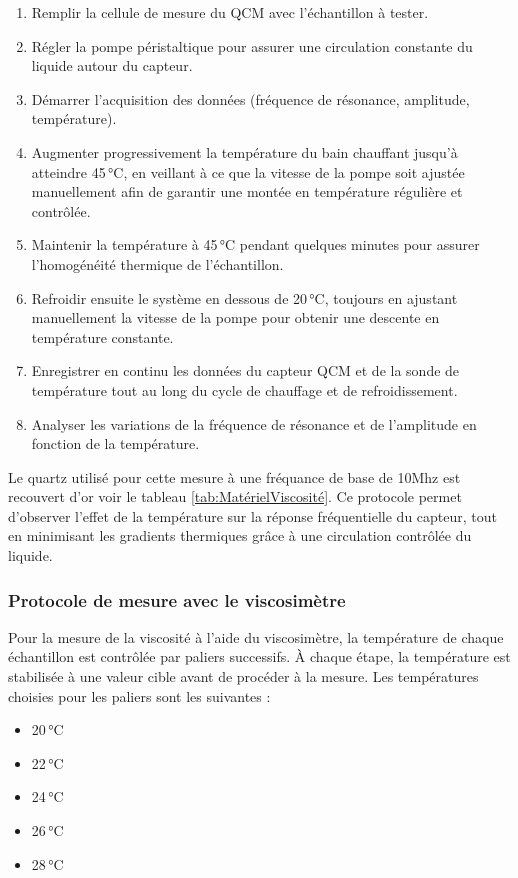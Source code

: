 \begin{enumerate}
    \item Remplir la cellule de mesure du QCM avec l'échantillon à tester.
    \item Régler la pompe péristaltique pour assurer une circulation constante du liquide autour du capteur.
    \item Démarrer l'acquisition des données (fréquence de résonance, amplitude, température).
    \item Augmenter progressivement la température du bain chauffant jusqu'à atteindre 45 °C, en veillant à ce que la vitesse de la pompe soit ajustée manuellement afin de garantir une montée en température régulière et contrôlée.
    \item Maintenir la température à 45 °C pendant quelques minutes pour assurer l'homogénéité thermique de l'échantillon.
    \item Refroidir ensuite le système en dessous de 20 °C, toujours en ajustant manuellement la vitesse de la pompe pour obtenir une descente en température constante.
    \item Enregistrer en continu les données du capteur QCM et de la sonde de température tout au long du cycle de chauffage et de refroidissement.
    \item Analyser les variations de la fréquence de résonance et de l'amplitude en fonction de la température.
\end{enumerate}

Le quartz utilisé pour cette mesure à une fréquance de base de 10Mhz est recouvert d'or voir le tableau \ref{tab:MatérielViscosité}.
Ce protocole permet d'observer l'effet de la température sur la réponse fréquentielle du capteur, tout en minimisant les gradients thermiques grâce à une circulation contrôlée du liquide.

\subsubsection{Protocole de mesure avec le viscosimètre}

Pour la mesure de la viscosité à l'aide du viscosimètre, la température de chaque échantillon est contrôlée par paliers successifs. À chaque étape, la température est stabilisée à une valeur cible avant de procéder à la mesure. Les températures choisies pour les paliers sont les suivantes :
\begin{itemize}[label=\textbullet]
    \item 20 °C
    \item 22 °C
    \item 24 °C
    \item 26 °C
    \item 28 °C
\end{itemize}

